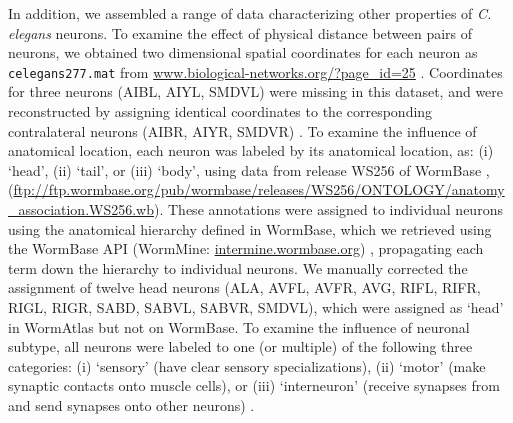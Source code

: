 \documentclass[10pt,letterpaper]{article}
\begin{document}
In addition, we assembled a range of data characterizing other properties of \emph{C. elegans} neurons.
To examine the effect of physical distance between pairs of neurons, we obtained two dimensional spatial coordinates for each neuron as \texttt{celegans277.mat} from \url{www.biological-networks.org/?page_id=25} \cite{choe2004network}.
Coordinates for three neurons (AIBL, AIYL, SMDVL) were missing in this dataset, and were reconstructed by assigning identical coordinates to the corresponding contralateral neurons (AIBR, AIYR, SMDVR) \cite{Varier2011}.
To examine the influence of anatomical location, each neuron was labeled by its anatomical location, as:
(i) `head', (ii) `tail', or (iii) `body', using data from release WS256 of WormBase \cite{Harris:2009kd}, (\url{ftp://ftp.wormbase.org/pub/wormbase/releases/WS256/ONTOLOGY/anatomy_association.WS256.wb}).
These annotations were assigned to individual neurons using the anatomical hierarchy defined in WormBase, which we retrieved using the WormBase API (WormMine: \url{intermine.wormbase.org}) \cite{Harris:2009kd}, propagating each term down the hierarchy to individual neurons.
We manually corrected the assignment of twelve head neurons (ALA, AVFL, AVFR, AVG, RIFL, RIFR, RIGL, RIGR, SABD, SABVL, SABVR, SMDVL), which were assigned as `head' in WormAtlas \cite{WormAtlas} but not on WormBase.
To examine the influence of neuronal subtype, all neurons were labeled to one (or multiple) of the following three categories:
(i) `sensory' (have clear sensory specializations),
(ii) `motor' (make synaptic contacts onto muscle cells), or
(iii) `interneuron' (receive synapses from and send synapses onto other neurons) \cite{White:1986tx}.
\end{document}
